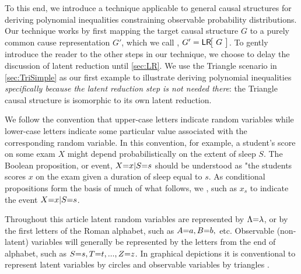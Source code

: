 To this end, we introduce a technique applicable to general causal structures for deriving polynomial inequalities constraining observable probability distributions.   Our technique works by first mapping the target causal structure $G$ to a purely common cause representation $G'$, which we call , $G'=\NamedFunction{LR}{\!G\!}$. 
To gently introduce the reader to the other steps in our technique, we choose to delay the discussion of latent reduction until \cref{sec:LR}. We use the Triangle scenario in \cref{sec:TriSimple} as our first example to illustrate deriving polynomial inequalities \emph{specifically because the latent reduction step is not needed there}: the Triangle causal structure is isomorphic to its own latent reduction.  






We follow the convention that upper-case letters indicate random variables while lower-case letters indicate some particular value associated with the corresponding random variable. In this convention, for example, a student's score on some exam $X$ might depend probabilistically on the extent of sleep $S$. The Boolean proposition, or {event}, $X\mathord{=}x|S\mathord{=}s$ should be understood as "the students scores $x$ on the exam given a duration of sleep equal to $s$. As conditional propositions form the basis of much of what follows, we , such as $x_s$ to indicate the event $X\mathord{=}x | S\mathord{=}s$. 

Throughout this article {latent random variables are represented by $\Lambda\mathord{=}\lambda$, or by the first letters of the Roman alphabet}, such as $A\mathord{=}a,B\mathord{=}b,$ etc. 
Observable (non-latent) variables will generally be represented by the letters from the end of alphabet, such as $S\mathord{=}s,T\mathord{=}t,...,Z\mathord{=}z$. In graphical depictions it is conventional to represent latent variables by circles and observable variables by triangles \cite{pusey2014gdag}.

